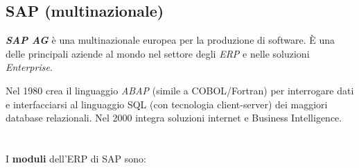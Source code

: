 \documentclass[a4paper, notitlepage, 9pt]{extreport}
\begin{document}
\subsection*{SAP (multinazionale)}
\textit{\textbf{SAP AG}} è una multinazionale europea per la
produzione di software. È una delle principali aziende al mondo nel settore degli \textit{ERP} e nelle soluzioni \textit{Enterprise}.
\newline

\noindent
Nel 1980 crea il linguaggio \textit{ABAP} (simile a COBOL/Fortran) per interrogare dati e interfacciarsi al linguaggio SQL (con tecnologia client-server) dei maggiori database relazionali. Nel 2000 integra soluzioni internet e Business Intelligence.
\\\\\\
I \textbf{moduli} dell'ERP di SAP sono:
\end{document}
